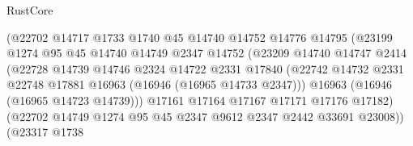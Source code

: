 \begin{lexlean}{RustCore}
\begin{coremodule}
                                  (@22702
                                    @14717
                                    @1733
                                    @1740
                                    @45
                                    @14740
                                    @14752
                                    @14776
                                    @14795
                                    (@23199
                                      @1274
                                      @95
                                      @45
                                      @14740
                                      @14749
                                      @2347
                                      @14752
                                      (@23209
                                        @14740
                                        @14747
                                        @2414
                                        (@22728
                                          @14739
                                          @14746
                                          @2324
                                          @14722
                                          @2331
                                          @17840
                                          (@22742
                                            @14732
                                            @2331
                                            @22748
                                            @17881
                                            @16963
                                            (@16946 (@16965 @14733 @2347)))
                                          @16963
                                          (@16946 (@16965 @14723 @14739)))
                                        @17161
                                        @17164
                                        @17167
                                        @17171
                                        @17176
                                        @17182)
                                      (@22702
                                        @14749
                                        @1274
                                        @95
                                        @45
                                        @2347
                                        @9612
                                        @2347
                                        @2442
                                        @33691
                                        @23008))
                                    (@23317
                                      @1738

\end{coremodule}
\end{lexlean}
